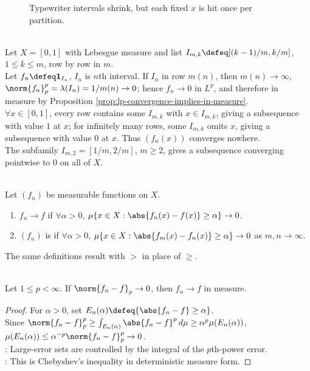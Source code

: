 \begin{figure}[H]
  \centering
  
  \caption{Typewriter intervals shrink, but each fixed $x$ is hit once per partition.}
  \label{fig:typewriter-intervals-lp-no-pointwise}
\end{figure}

\begin{example} \label{ex:typewriter-lp-no-pointwise} \\
Let $X=[0,1]$ with Lebesgue measure and list $I_{m,k}\defeq[(k-1)/m,k/m]$, $1\leq k\leq m$, row by row in $m$.\\
Let $f_n\defeq\mathbf{1}_{I_n}$, $I_n$ is $n$th interval. If $I_n$ in row $m(n)$, then $m(n)\to\infty$, $\norm{f_n}_p^p=\lambda(I_n)=1/m(n)\to0$; hence $f_n\to0$ in $L^p$, and therefore in measure by Proposition \ref{prop:lp-convergence-implies-in-measure}.\\
$\forall x\in[0,1]$, every row contains some $I_{m,k}$ with $x\in I_{m,k}$, giving a subsequence with value $1$ at $x$; for infinitely many rows, some $I_{m,k}$ omits $x$, giving a subsequence with value $0$ at $x$. Thus $(f_n(x))$ converges nowhere.\\
The subfamily $I_{m,2}=[1/m,2/m]$, $m\geq2$, gives a subsequence converging pointwise to $0$ on all of $X$.
\end{example}

\begin{definition} \label{def:convergence-in-measure-and-cauchy} \\
Let $(f_n)$ be measurable functions on $X$.
\begin{enumerate}[label=(\roman*)]
\setlength{\itemsep}{0pt}
\item $f_n\to f$  if $\forall\alpha>0$, $\mu\{x\in X:\abs{f_n(x)-f(x)}\geq\alpha\}\to0$.
\item $(f_n)$ is  if $\forall\alpha>0$, $\mu\{x\in X:\abs{f_m(x)-f_n(x)}\geq\alpha\}\to0$ as $m,n\to\infty$.
\end{enumerate}
The same definitions result with $>$ in place of $\geq$.
\end{definition}

\begin{proposition} \label{prop:lp-convergence-implies-in-measure} \\
Let $1\leq p<\infty$. If $\norm{f_n-f}_p\to0$, then $f_n\to f$ in measure.
\begin{proof}
For $\alpha>0$, set $E_n(\alpha)\defeq\{\abs{f_n-f}\geq\alpha\}$.\\
Since $\norm{f_n-f}_p^p\geq\int_{E_n(\alpha)}\abs{f_n-f}^p\,d\mu\geq\alpha^p\mu(E_n(\alpha))$, $\mu(E_n(\alpha))\leq\alpha^{-p}\norm{f_n-f}_p^p\to0$.\\
: Large-error sets are controlled by the integral of the $p$th-power error.\\
: This is Chebyshev's inequality in deterministic measure form.
\end{proof}
\end{proposition}

